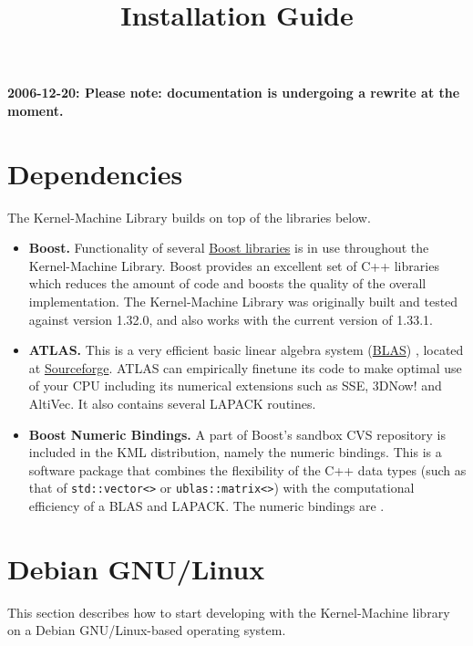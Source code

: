 \documentclass{article}
\begin{document}
\title{Installation Guide}
\maketitle

\textbf{2006-12-20: Please note: documentation is undergoing a rewrite at the moment.}

\tableofcontents


\section{Dependencies}

The Kernel-Machine Library builds on top of the libraries below.

\begin{itemize}
\item \textbf{Boost.} Functionality of several \href{http://www.boost.org/}{Boost libraries} is 
in use throughout the Kernel-Machine Library. 
Boost provides
an excellent set of C++ libraries which reduces the amount of code and boosts 
the quality of the overall implementation.
The Kernel-Machine Library was originally built and tested against version 1.32.0, and also works 
with the current version of 1.33.1. 

\item \textbf{ATLAS.} This is a very efficient basic linear algebra system 
(\href{http://www.netlib.org/blas/faq.html}{BLAS}) \cite{whaley01automated}, located at
\href{http://math-atlas.sourceforge.net}{Sourceforge}. 
ATLAS can empirically finetune 
its code to make optimal use of your CPU 
including its numerical extensions such as SSE, 3DNow! and AltiVec. 
It also contains several LAPACK routines. 

\item \textbf{Boost Numeric Bindings.} A part of Boost's sandbox CVS repository is 
included in the KML distribution, 
namely the numeric bindings. 
This is a software package that combines the flexibility of the C++ data types (such as that of 
\texttt{std::vector<>} or \texttt{ublas::matrix<>}) with the computational 
efficiency of a BLAS and LAPACK. The numeric bindings are .

\end{itemize}


\section{Debian GNU/Linux}

This section describes how to start developing with
the Kernel-Machine library on a Debian GNU/Linux-based operating system.
\end{document}
